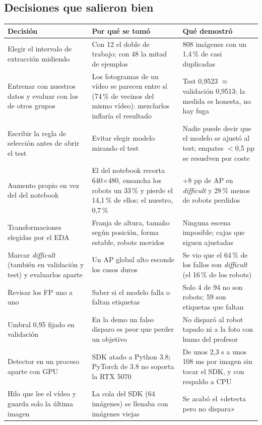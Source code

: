 \documentclass[11pt,a4paper]{article}
\begin{document}
\subsection{Decisiones que salieron bien}
\begin{longtable}{@{}P{3.6cm}P{5.4cm}P{5.5cm}@{}}
\toprule
\textbf{Decisión} & \textbf{Por qué se tomó} & \textbf{Qué demostró} \\
\midrule
\endhead
Elegir el intervalo de extracción midiendo & Con 12 el doble de trabajo; con 48 la mitad de ejemplos & 808 imágenes con un 1,4\,\% de casi duplicadas \\
Entrenar con nuestros datos y evaluar con los de otros grupos & Los fotogramas de un vídeo se parecen entre sí (74\,\% de vecinos del mismo vídeo): mezclarlos inflaría el resultado & Test 0,9523 $\approx$ validación 0,9513: la medida es honesta, no hay fuga \\
Escribir la regla de selección antes de abrir el test & Evitar elegir modelo mirando el test & Nadie puede decir que el modelo se ajustó al test; empates $<$0,5 pp se resuelven por coste \\
Aumento propio en vez del del notebook & El del notebook recorta 640$\times$480, ensancha los robots un 33\,\% y pierde el 14,1\,\% de ellos; el nuestro, 0,7\,\% & +8 pp de AP en \emph{difficult} y 28\,\% menos de robots perdidos \\
Transformaciones elegidas por el EDA & Franja de altura, tamaño según posición, forma estable, robots movidos & Ninguna escena imposible; cajas que siguen ajustadas \\
Marcar \emph{difficult} (también en validación y test) y evaluarlos aparte & Un AP global alto esconde los casos duros & Se vio que el 64\,\% de los fallos son \emph{difficult} (el 16\,\% de los robots) \\
Revisar los FP uno a uno & Saber si el modelo falla o faltan etiquetas & Solo 4 de 94 no son robots; 59 son etiquetas que faltan \\
Umbral 0,95 fijado en validación & En la demo un falso disparo es peor que perder un objetivo & No disparó al robot tapado ni a la foto con humo del profesor \\
Detector en un proceso aparte con GPU & SDK atado a Python 3.8; PyTorch de 3.8 no soporta la RTX 5070 & De unos 2,3 s a unos 108 ms por imagen sin tocar el SDK, y con respaldo a CPU \\
Hilo que lee el vídeo y guarda solo la última imagen & La cola del SDK (64 imágenes) se llenaba con imágenes viejas & Se acabó el «detecta pero no dispara» \\

\end{longtable}
\end{document}
